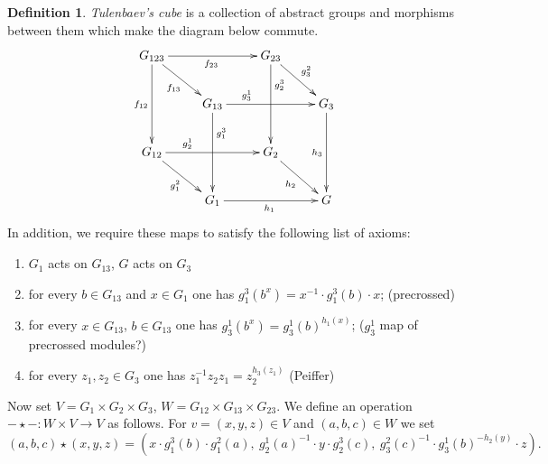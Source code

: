 \documentclass[oneside, 10pt]{amsart}
\numberwithin{equation}{section}
\numberwithin{lemma}{section}
\theoremstyle{definition}
\newtheorem{dfn}[lemma]{Definition}
\theoremstyle{remark}
\begin{document}
\begin{dfn} {\it Tulenbaev's cube} is a collection of abstract groups and morphisms between them which make the diagram below commute.
\[\xymatrix{
G_{123} \ar[rr]_{f_{23}} \ar[dd]_{f_{12}} \ar[rd]_{f_{13}} &                        & G_{23} \ar[dd]^(.3){g_2^3} \ar[rd]^{g^2_3} &           \\
                                & G_{13} \ar[rr]^(.3){g^1_3} \ar^(.3){g^3_1}[dd] &                   & G_3 \ar[dd]_{h_3} \\
G_{12} \ar[rr]^(.3){g_2^1} \ar[rd]_{g_1^2}          &                        & G_2 \ar[rd]_{h_2}         &           \\
                                & G_1 \ar[rr]_{h_1}              &                   & G}\]
In addition, we require these maps to satisfy the following list of axioms:
\begin{enumerate}
 \item $G_1$ acts on $G_{13}$, $G$ acts on $G_3$ %
 \item for every $b \in G_{13}$ and $x \in G_1$ one has $g_1^3(b ^ x) = x^{-1} \cdot g_1^3(b) \cdot x$; (precrossed)
 \item for every $x\in G_{13}$, $b \in G_{13}$ one has $g_3^1(b^x) = g_3^1(b)^{h_1(x)}$; ($g_3^1$ map of precrossed modules?)
 \item for every $z_1, z_2 \in G_3$ one has $z_1^{-1} z_2 z_1 = z_2^{h_3(z_1)}$ (Peiffer)
\end{enumerate}
\end{dfn}
Now set $V = G_1 \times G_2 \times G_3$, $W = G_{12} \times G_{13} \times G_{23}$.
We define an operation $- \star - \colon W \times V \to V$ as follows. For $v = (x, y, z) \in V$ and $(a, b, c) \in W$ we set 
\[(a, b, c) \star (x, y, z) = (x \cdot g_1^3(b) \cdot g_1^2(a),\ g_2^1(a)^{-1} \cdot y \cdot g_2^3(c),\ g_3^2(c)^{-1} \cdot g_3^1(b)^{-h_2(y)} \cdot z).\]
\end{document}
